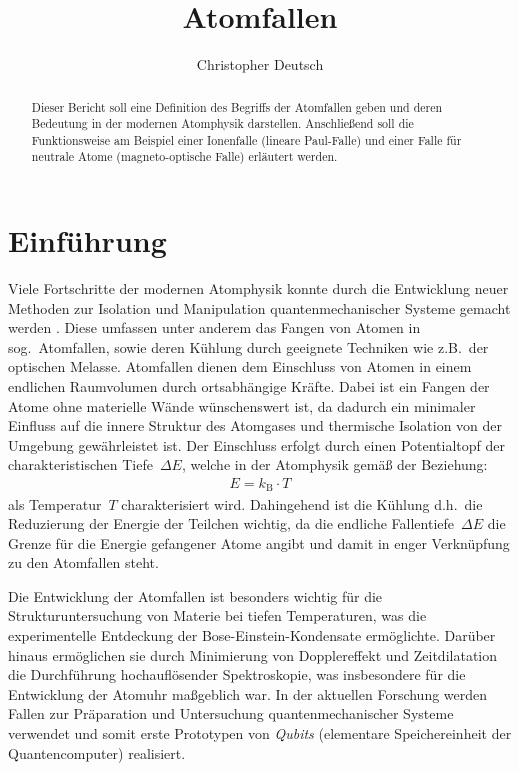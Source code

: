 \documentclass[twocolumn]{revtex4}
\begin{document}
\title{Atomfallen}

\author{Christopher Deutsch}




\begin{abstract}
%
Dieser Bericht soll eine Definition des Begriffs der Atomfallen geben und deren Bedeutung in der modernen Atomphysik darstellen. Anschließend soll die Funktionsweise am Beispiel einer Ionenfalle (lineare Paul-Falle) und einer Falle für neutrale Atome (magneto-optische Falle) erläutert werden.
%
\end{abstract}

\maketitle

\section{Einführung}
Viele Fortschritte der modernen Atomphysik konnte durch die Entwicklung neuer Methoden zur Isolation und Manipulation quantenmechanischer Systeme gemacht werden \cite{trapping}.
Diese umfassen unter anderem das Fangen von Atomen in sog.~Atomfallen, sowie deren Kühlung durch geeignete Techniken wie z.B.\ der optischen Melasse.
Atomfallen dienen dem Einschluss von Atomen in einem endlichen Raumvolumen durch ortsabhängige Kräfte. 
Dabei ist ein Fangen der Atome ohne materielle Wände wünschenswert ist, da dadurch ein minimaler Einfluss auf die innere Struktur des Atomgases und thermische Isolation von der Umgebung gewährleistet ist.
Der Einschluss erfolgt durch einen Potentialtopf der charakteristischen Tiefe~$\Delta E$, welche in der Atomphysik gemäß der Beziehung:
\begin{align}
	E = k_\mathrm{B} \cdot T
\end{align}
als Temperatur~$T$ charakterisiert wird.
Dahingehend ist die Kühlung d.h.\ die Reduzierung der Energie der Teilchen wichtig, da die endliche Fallentiefe~$\Delta E$ die Grenze für die Energie gefangener Atome angibt und damit in enger Verknüpfung zu den Atomfallen steht.

Die Entwicklung der Atomfallen ist besonders wichtig für die Strukturuntersuchung von Materie bei tiefen Temperaturen, was die experimentelle Entdeckung der Bose-Einstein-Kondensate ermöglichte.
Darüber hinaus ermöglichen sie durch Minimierung von Dopplereffekt und Zeitdilatation die Durchführung hochauflösender Spektroskopie, was insbesondere für die Entwicklung der Atomuhr maßgeblich war.
In der aktuellen Forschung werden Fallen zur Präparation und Untersuchung quantenmechanischer Systeme verwendet und somit erste Prototypen von \emph{Qubits} (elementare Speichereinheit der Quantencomputer) realisiert.
\end{document}
